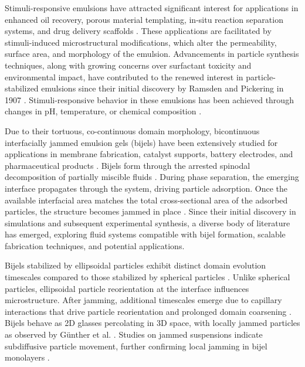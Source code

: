 Stimuli-responsive emulsions have attracted significant interest for applications in enhanced oil recovery, porous material templating, 
in-situ reaction separation systems, and drug delivery scaffolds \cite{tang_stimuli-responsive_2016, bago_rodriguez_capsules_2019}. 
These applications are facilitated by stimuli-induced microstructural modifications, which alter the permeability, surface area, and 
morphology of the emulsion. Advancements in particle synthesis techniques, along with growing concerns over surfactant toxicity and 
environmental impact, have contributed to the renewed interest in particle-stabilized emulsions since their initial discovery by Ramsden 
and Pickering in 1907 \cite{rozynek_opening_2019, zhou_magnetic_2011}. Stimuli-responsive behavior in these emulsions has been achieved 
through changes in pH, temperature, or chemical composition 
\cite{maingret_dextran-based_2020, lin_ph-responsive_2018, raju_ph-responsive_2018, zhang_ph_2022}.  

Due to their tortuous, co-continuous domain morphology, bicontinuous interfacially jammed emulsion gels (bijels) have been 
extensively studied for applications in membrane fabrication, catalyst supports, battery electrodes, and pharmaceutical 
products \cite{yabuno_preparation_2020, samdani_bicontinuous_2017, cha_bicontinuous_2019, garcia_scalable_2019, santiago_cordoba_aerobijels_2020}.  
Bijels form through the arrested spinodal decomposition of partially miscible fluids 
\cite{stratford_colloidal_2005, herzig_bicontinuous_2007, tavacoli_novel_2011}. During phase separation, the emerging interface propagates 
through the system, driving particle adsorption. Once the available interfacial area matches the total cross-sectional area of the adsorbed 
particles, the structure becomes jammed in place \cite{stratford_colloidal_2005, herzig_bicontinuous_2007, tavacoli_novel_2011}. Since their 
initial discovery in simulations and subsequent experimental synthesis, a diverse body of literature has emerged, exploring fluid systems 
compatible with bijel formation, scalable fabrication techniques, and potential applications.

Bijels stabilized by ellipsoidal particles exhibit distinct domain evolution timescales compared to those stabilized by 
spherical particles \cite{gunther_timescales_2014}. Unlike spherical particles, ellipsoidal particle reorientation at the 
interface influences microstructure. After jamming, additional timescales emerge due to capillary interactions that drive 
particle reorientation and prolonged domain coarsening \cite{gunther_timescales_2014}. Bijels behave as 2D glasses percolating 
in 3D space, with locally jammed particles as observed by Günther et al. 
\cite{ching_bijel_2022, torquato_jammed_2010, gunther_timescales_2014}. Studies on jammed suspensions indicate subdiffusive 
particle movement, further confirming local jamming in bijel monolayers \cite{savelev_diffusion_2006}.

